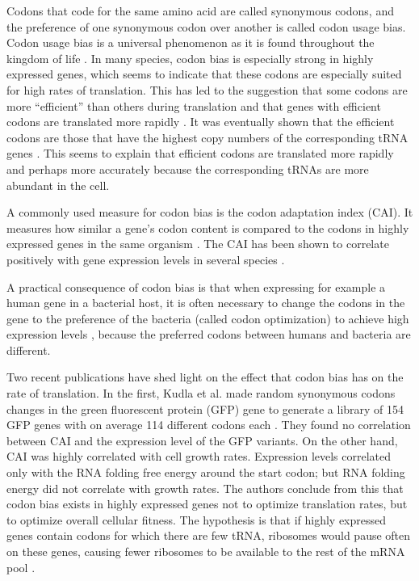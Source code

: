 Codons that code for the same amino acid are called synonymous codons, and the
preference of one synonymous codon over another is called codon usage bias.
Codon usage bias is a universal phenomenon as it is found throughout the
kingdom of life \cite{sharp_codon_1988}. In many species, codon bias is
especially strong in highly expressed genes, which seems to indicate that these
codons are especially suited for high rates of translation. This has led to
the suggestion that some codons are more ``efficient'' than others during
translation and that genes with efficient codons are translated more
rapidly \cite{moriyama_gene_1998}. It was eventually shown that the efficient
codons are those that have the highest copy numbers of the corresponding tRNA
genes \cite{reis_solving_2004, elf_selective_2003}. This seems to explain that
efficient codons are translated more rapidly and perhaps more accurately
because the corresponding tRNAs are more abundant in the cell.

A commonly used measure for codon bias is the codon adaptation index (CAI). It
measures how similar a gene's codon content is compared to the codons in highly
expressed genes in the same organism \cite{sharp_codon_1987}. The CAI has been
shown to correlate positively with gene expression levels in several species
\cite{duret_expression_1999, jansen_revisiting_2003}.

A practical consequence of codon bias is that when expressing for example a
human gene in a bacterial host, it is often necessary to change the codons in
the gene to the preference of the bacteria (called codon optimization) to
achieve high expression levels \cite{gustafsson_codon_2004}, because the
preferred codons between humans and bacteria are different.

Two recent publications have shed light on the effect that codon bias has on
the rate of translation. In the first, Kudla et al. made random synonymous
codons changes in the green fluorescent protein (GFP) gene to generate a library
of 154 GFP genes with on average 114 different codons each
\cite{kudla_coding-sequence_2009}. They found no correlation between CAI and
the expression level of the GFP variants. On the other hand, CAI was highly
correlated with cell growth rates. Expression levels correlated only with the
RNA folding free energy around the start codon; but RNA folding energy did not
correlate with growth rates. The authors conclude from this that codon bias
exists in highly expressed genes not to optimize translation rates, but to
optimize overall cellular fitness. The hypothesis is that if highly expressed
genes contain codons for which there are few tRNA, ribosomes would pause
often on these genes, causing fewer ribosomes to be available to the rest of
the mRNA pool \cite{kudla_coding-sequence_2009}.

